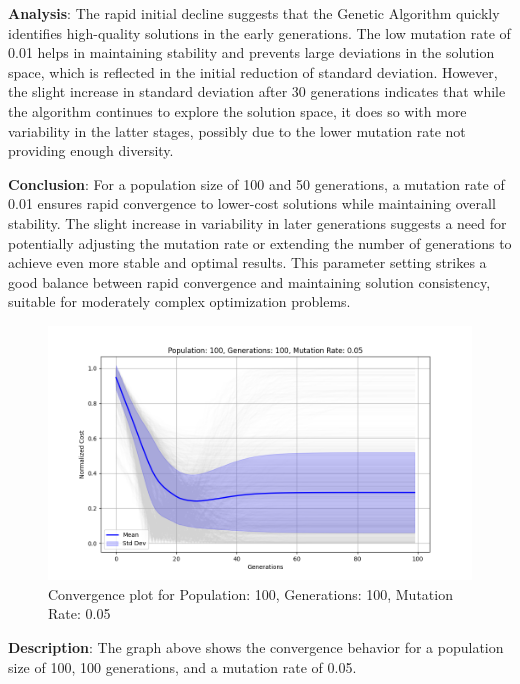 \documentclass{article}
\begin{document}
    \textbf{Analysis}: The rapid initial decline suggests that the Genetic Algorithm quickly identifies high-quality solutions in the early generations. The low mutation rate of 0.01 helps in maintaining stability and prevents large deviations in the solution space, which is reflected in the initial reduction of standard deviation. However, the slight increase in standard deviation after 30 generations indicates that while the algorithm continues to explore the solution space, it does so with more variability in the latter stages, possibly due to the lower mutation rate not providing enough diversity.

    \textbf{Conclusion}: For a population size of 100 and 50 generations, a mutation rate of 0.01 ensures rapid convergence to lower-cost solutions while maintaining overall stability. The slight increase in variability in later generations suggests a need for potentially adjusting the mutation rate or extending the number of generations to achieve even more stable and optimal results. This parameter setting strikes a good balance between rapid convergence and maintaining solution consistency, suitable for moderately complex optimization problems.

    \begin{figure}[H]
        \centering
        \includegraphics[width=\textwidth]{genetic_algorithm/Population_100_Generations_100_MutationRate_0.05}
        \caption{Convergence plot for Population: 100, Generations: 100, Mutation Rate: 0.05}
        \label{fig:ga_100_100_05}
    \end{figure}

    \textbf{Description}: The graph above shows the convergence behavior for a population size of 100, 100 generations, and a mutation rate of 0.05.
\end{document}
